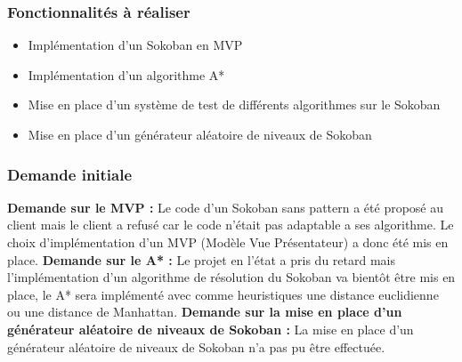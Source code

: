 \documentclass[a4paper,12pt]{article} %
\begin{document}
\subsubsection{Fonctionnalités à réaliser}
\noindent
\begin{itemize}
\item Implémentation d'un Sokoban en MVP
\item Implémentation d'un algorithme A*
\item Mise en place d'un système de test de différents algorithmes sur le Sokoban
\item Mise en place d'un générateur aléatoire de niveaux de Sokoban
\newline
\end{itemize} 




\subsubsection{Demande initiale}
\noindent
\textbf{Demande sur le MVP :}
\newline\newline
Le code d'un Sokoban sans pattern a été proposé au client mais le client a refusé car le code n'était pas adaptable a ses algorithme.
\newline
Le choix d'implémentation d'un MVP (Modèle Vue Présentateur) a donc été mis en place.
\newline\newline
\textbf{Demande sur le A* :}
\newline\newline
Le projet en l'état a pris du retard mais l'implémentation d'un algorithme de résolution du Sokoban va bientôt être mis en place, le A* sera implémenté avec comme heuristiques une distance euclidienne ou une distance de Manhattan.
\newline\newline
\textbf{Demande sur la mise en place d'un générateur aléatoire de niveaux de Sokoban :}
\newline\newline
La mise en place d'un générateur aléatoire de niveaux de Sokoban n'a pas pu être effectuée.
%
\end{document}
